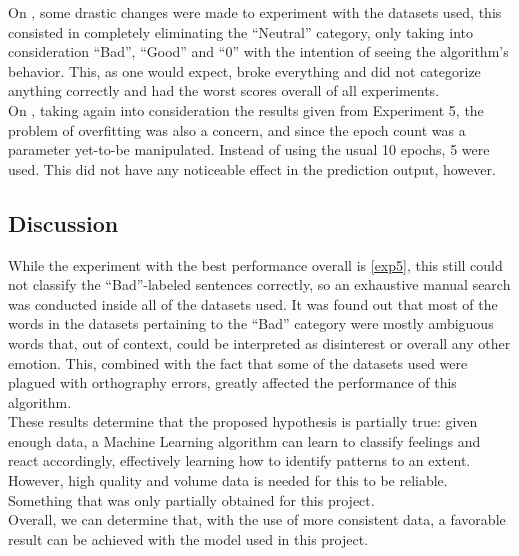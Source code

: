 On , some drastic changes were made to experiment with the datasets used, this consisted in completely eliminating the ``Neutral'' category, only taking into consideration ``Bad'', ``Good'' and ``0'' with the intention of seeing the algorithm's behavior. This, as one would expect, broke everything and did not categorize anything correctly and had the worst scores overall of all experiments. \\

On , taking again into consideration the results given from Experiment 5, the problem of overfitting was also a concern, and since the epoch count was a parameter yet-to-be manipulated. Instead of using the usual 10 epochs, 5 were used. This did not have any noticeable effect in the prediction output, however.

\subsection{Discussion}
While the experiment with the best performance overall is \ref{exp5}, this still could not classify the ``Bad''-labeled sentences correctly, so an exhaustive manual search was conducted inside all of the datasets used. It was found out that most of the words in the datasets pertaining to the ``Bad'' category were mostly ambiguous words that, out of context, could be interpreted as disinterest or overall any other emotion. This, combined with the fact that some of the datasets used were plagued with orthography errors, greatly affected the performance of this algorithm.\\

These results determine that the proposed hypothesis is partially true: given enough data, a Machine Learning algorithm can learn to classify feelings and react accordingly, effectively learning how to identify patterns to an extent. However, high quality and volume data is needed for this to be reliable. Something that was only partially obtained for this project.\\

Overall, we can determine that, with the use of more consistent data, a favorable result can be achieved with the model used in this project.